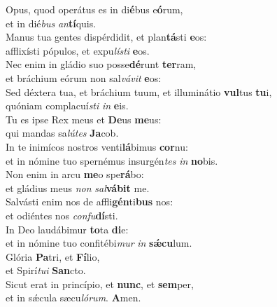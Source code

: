 \evenverse Opus, quod operátus es in di\textbf{é}bus e\textbf{ó}rum,~\*\\
\evenverse et in dié\textit{bus} \textit{an}\textbf{tí}quis.\\
\oddverse Manus tua gentes dispérdidit, et plan\textbf{tá}sti \textbf{e}os:~\*\\
\oddverse afflixísti pópulos, et expu\textit{lí}\textit{sti} \textbf{e}os.\\
\evenverse Nec enim in gládio suo posse\textbf{dé}runt \textbf{ter}ram,~\*\\
\evenverse et bráchium eórum non sal\textit{vá}\textit{vit} \textbf{e}os:\\
\oddverse Sed déxtera tua, et bráchium tuum, et illuminátio \textbf{vul}tus \textbf{tu}i,~\*\\
\oddverse quóniam complacuí\textit{sti} \textit{in} \textbf{e}is.\\
\evenverse Tu es ipse Rex meus et \textbf{De}us \textbf{me}us:~\*\\
\evenverse qui mandas sa\textit{lú}\textit{tes} \textbf{Ja}cob.\\
\oddverse In te inimícos nostros venti\textbf{lá}bimus \textbf{cor}nu:~\*\\
\oddverse et in nómine tuo spernémus insurgén\textit{tes} \textit{in} \textbf{no}bis.\\
\evenverse Non enim in arcu \textbf{me}o spe\textbf{rá}bo:~\*\\
\evenverse et gládius meus \textit{non} \textit{sal}\textbf{vá}\textbf{bit} me.\\
\oddverse Salvásti enim nos de affli\textbf{gén}ti\textbf{bus} nos:~\*\\
\oddverse et odiéntes nos \textit{con}\textit{fu}\textbf{dí}sti.\\
\evenverse In Deo laudábimur \textbf{to}ta \textbf{di}e:~\*\\
\evenverse et in nómine tuo confitébi\textit{mur} \textit{in} \textbf{sǽ}\textbf{cu}lum.\\
\oddverse Glória \textbf{Pa}tri, et \textbf{Fí}lio,~\*\\
\oddverse et Spirí\textit{tu}\textit{i} \textbf{San}cto.\\
\evenverse Sicut erat in princípio, et \textbf{nunc}, et \textbf{sem}per,~\*\\
\evenverse et in sǽcula sæcu\textit{ló}\textit{rum}. \textbf{A}men.\\
